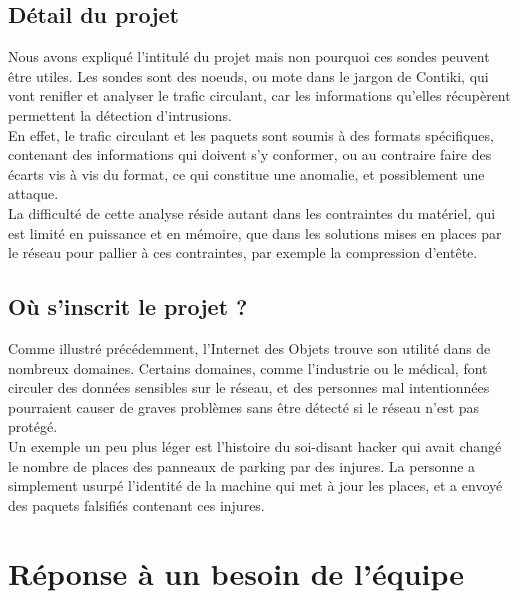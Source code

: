 	\subsection{Détail du projet}
		Nous avons expliqué l'intitulé du projet mais non pourquoi ces sondes peuvent être utiles. Les sondes sont des noeuds, ou mote dans le jargon de Contiki, qui vont renifler et analyser le trafic circulant, car les informations qu'elles récupèrent permettent la détection d'intrusions. \\
		En effet, le trafic circulant et les paquets sont soumis à des formats spécifiques, contenant des informations qui doivent s'y conformer, ou au contraire faire des écarts vis à vis du format, ce qui constitue une anomalie, et possiblement une attaque.\\
		La difficulté de cette analyse réside autant dans les contraintes du matériel, qui est limité en puissance et en mémoire, que dans les solutions mises en places par le réseau pour pallier à ces contraintes, par exemple la compression d'entête.
	\subsection{Où s'inscrit le projet ?}
		Comme illustré précédemment, l'Internet des Objets trouve son utilité dans de nombreux domaines. Certains domaines, comme l'industrie ou le médical, font circuler des données sensibles sur le réseau, et des personnes mal intentionnées pourraient causer de graves problèmes sans être détecté si le réseau n'est pas protégé.\\
		Un exemple un peu plus léger est l'histoire du soi-disant hacker qui avait changé le nombre de places des panneaux de parking par des injures. La personne a simplement usurpé l'identité de la machine qui met à jour les places, et a envoyé des paquets falsifiés contenant ces injures.

\section{Réponse à un besoin de l'équipe}
	
